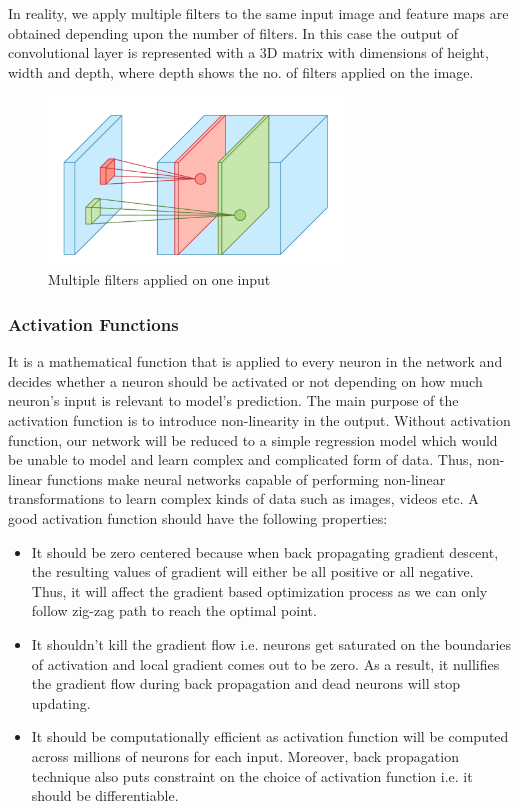 In reality, we apply multiple filters to the same 
input image and feature maps are obtained depending upon the 
number of filters. In this case the output of convolutional layer 
is represented with a 3D matrix with dimensions of height, width 
and depth, where depth 
shows the no. of filters applied on the image. 

\begin{figure}[H]
	\centering
		\includegraphics[width=0.70\textwidth]{CHAPTERS/Chapter-3/Images/3.6}
	\caption{Multiple filters applied on one input}
	\label{fig:3.6}
\end{figure}

\subsubsection{Activation Functions}

It is a mathematical function that is applied to every neuron 
in the network and decides whether a neuron should be activated 
or not depending on how much neuron’s input is relevant to model’s prediction. 
The main purpose of the activation function is to introduce non-linearity in the 
output. Without activation function, our network will be reduced to a simple 
regression model which would be unable to model and learn complex and complicated 
form of data. Thus, non-linear functions make neural networks capable 
of performing non-linear transformations to learn complex kinds of data such 
as 	images, videos etc. A good activation 
function should have the following properties:
\begin{itemize}
\item It should be zero centered because when back propagating gradient descent, the resulting values of gradient will either be all positive or all negative. Thus, it will affect the gradient based optimization process as we can only follow zig-zag path to reach the optimal point.
\item It shouldn’t kill the gradient flow i.e. neurons get saturated on the boundaries of activation and local gradient comes out to be zero. As a result, it nullifies the gradient flow during back propagation and dead neurons will stop updating.
\item It should be computationally efficient as activation function will be computed across millions of neurons for each input. Moreover, back propagation technique also puts constraint on the choice of activation function i.e. it should be differentiable.

\end{itemize}

